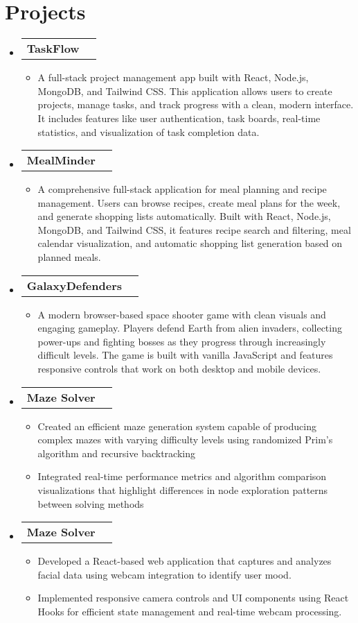 \documentclass[letterpaper,11pt]{article}
\makeatletter
\newcommand{\resumeItem}[1]{
  \item\footnotesize{#1}
    {\vspace{-2pt}}
  }
\newcommand{\resumeProjectHeading}[2]{
    \item
    \begin{tabular*}{0.97\textwidth}{l@{\extracolsep{\fill}}r}
      \footnotesize#1 & \footnotesize#2 \\
    \end{tabular*}\vspace{-7pt}
}
\newcommand{\resumeSubHeadingListStart}{\begin{itemize}[leftmargin=0.15in, label={}]}
\newcommand{\resumeSubHeadingListEnd}{\end{itemize}}
\newcommand{\resumeItemListStart}{\begin{itemize}[leftmargin=*]\vspace{-2pt}}
\newcommand{\resumeItemListEnd}{\end{itemize}\vspace{-5pt}}
\makeatother
\begin{document}
\section{Projects}
    \resumeSubHeadingListStart
      \resumeProjectHeading
          {\textbf{TaskFlow} \emph{}}{}
          \resumeItemListStart
            \resumeItem{A full-stack project management app built with React, Node.js, MongoDB, and Tailwind CSS. This application allows users to create projects, manage tasks, and track progress with a clean, modern interface. It includes features like user authentication, task boards, real-time statistics, and visualization of task completion data.}
          \resumeItemListEnd
      \resumeProjectHeading
          {\textbf{MealMinder} \emph{}}{}
          \resumeItemListStart
            \resumeItem{A comprehensive full-stack application for meal planning and recipe management. Users can browse recipes, create meal plans for the week, and generate shopping lists automatically. Built with React, Node.js, MongoDB, and Tailwind CSS, it features recipe search and filtering, meal calendar visualization, and automatic shopping list generation based on planned meals.}
          \resumeItemListEnd
      \resumeProjectHeading
          {\textbf{GalaxyDefenders} \emph{}}{}
          \resumeItemListStart
            \resumeItem{A modern browser-based space shooter game with clean visuals and engaging gameplay. Players defend Earth from alien invaders, collecting power-ups and fighting bosses as they progress through increasingly difficult levels. The game is built with vanilla JavaScript and features responsive controls that work on both desktop and mobile devices.}
          \resumeItemListEnd
      \resumeProjectHeading
          {\textbf{Maze Solver} \emph{}}{}
          \resumeItemListStart
            \resumeItem{Created an efficient maze generation system capable of producing complex mazes with varying difficulty levels using randomized Prim's algorithm and recursive backtracking}
            \resumeItem{Integrated real-time performance metrics and algorithm comparison visualizations that highlight differences in node exploration patterns between solving methods}
        \resumeItemListEnd
        \resumeProjectHeading
        {\textbf{Maze Solver} \emph{}}{}
        \resumeItemListStart
          \resumeItem{Developed a React-based web application that captures and analyzes facial data using webcam integration to identify user mood.}
          \resumeItem{Implemented responsive camera controls and UI components using React Hooks for efficient state management and real-time webcam processing.}
      \resumeItemListEnd
    \resumeSubHeadingListEnd
\end{document}
